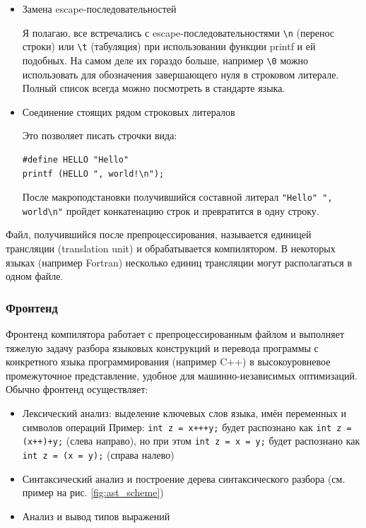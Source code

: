 \documentclass[a4paper,12pt,oneside]{article}
\begin{document}
\begin{itemize}
\item Замена escape-последовательностей

Я полагаю, все встречались с escape-последовательностями \lstinline!\n! (перенос строки) или \lstinline!\t! (табуляция) при использовании функции printf и ей подобных. На самом деле их гораздо больше, например \lstinline!\0! можно использовать для обозначения завершающего нуля в строковом литерале. Полный список всегда можно посмотреть в стандарте языка.

\item Соединение стоящих рядом строковых литералов

Это позволяет писать строчки вида:

\begin{lstlisting}
#define HELLO "Hello"
printf (HELLO ", world!\n");
\end{lstlisting}

После макроподстановки получившийся составной литерал \lstinline!"Hello" ", world\n"! пройдет конкатенацию строк и превратится в одну строку.
\end{itemize}

Файл, получившийся после препроцессирования, называется единицей трансляции (translation unit) и обрабатывается компилятором. В некоторых языках (например Fortran) несколько единиц трансляции могут располагаться в одном файле.

\subsubsection{Фронтенд}\label{subsubsec:Frontend}

Фронтенд компилятора работает с препроцессированным файлом и выполняет тяжелую задачу разбора языковых конструкций и перевода программы с конкретного языка программирования (например C++) в высокоуровневое промежуточное представление, удобное для машинно-независимых оптимизаций. Обычно фронтенд осуществляет:

\begin{itemize}
\item Лексический анализ: выделение ключевых слов языка, имён переменных и символов операций
Пример: \lstinline!int z = x+++y;! будет распознано как \lstinline!int z = (x++)+y;! (слева направо), но при этом \lstinline!int z = x = y;! будет распознано как \lstinline!int z = (x = y);! (справа налево)
\item Синтаксический анализ и построение дерева синтаксического разбора (см. пример на рис. \ref{fig:ast_scheme})
\item Анализ и вывод типов выражений
\end{itemize}
\end{document}
